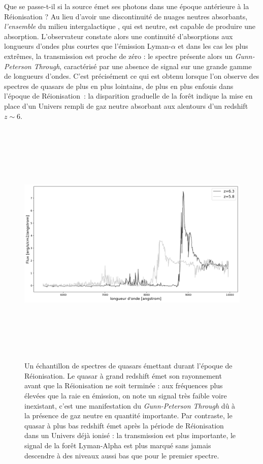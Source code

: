 Que se passe-t-il si la source émet ses photons dans une époque antérieure à la Réionisation ? Au lieu d'avoir une discontinuité de nuages neutres absorbants, \textit{l'ensemble} du milieu intergalactique , qui est neutre, est capable de produire une absorption. L'observateur constate alors une continuité d'absorptions aux longueurs d'ondes plus courtes que l'émission Lyman-$\alpha$ et dans les cas les plus extrêmes, la transmission est proche de zéro : le spectre présente alors un \textit{Gunn-Peterson Through}, caractérisé par une absence de signal sur une grande gamme de longueurs d'ondes. C'est précisément ce qui est obtenu lorsque l'on observe des spectres de quasars de plus en plus lointains, de plus en plus enfouis dans l'époque de Réionisation~: la disparition graduelle de la forêt indique la mise en place d'un Univers rempli de gaz neutre absorbant aux alentours d'un redshift $z\sim 6$.
\begin{figure}[htbp]
	\centering
		\includegraphics[height=12cm]{figs/Becker01.png}
		\caption[Spectres de quasars durant la Réionisation]{Un échantillon de spectres de quasars émettant durant l'époque de Réionisation. Le quasar à grand redshift émet son rayonnement avant que la Réionisation ne soit terminée : aux fréquences plus élevées que la raie en émission, on note un signal très faible voire inexistant, c'est une manifestation du \textit{Gunn-Peterson Through} dû à la présence de gaz neutre en quantité importante. Par contraste, le quasar à plus bas redshift émet après la période de Réionisation dans un Univers déjà ionisé : la transmission est plus importante, le signal de la forêt Lyman-Alpha est plus marqué sans jamais descendre à des niveaux aussi bas que pour le premier spectre.}
	\label{f:fan06}
\end{figure}

